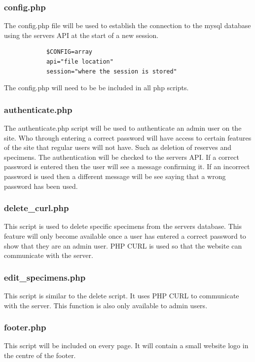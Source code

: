 	\subsubsection{config.php}
		The config.php file will be used to establish the connection to the mysql database using the servers API at the start of a new session.
		\begin{verbatim}
			$CONFIG=array
			api="file location"
			session="where the session is stored"
		\end{verbatim}
		The config.php will need to be be included in all php scripts.


	\subsubsection{authenticate.php}
		The authenticate.php script will be used to authenticate an admin user on the site. Who through entering a correct password will have access to certain features of the site that regular users will not have. Such as deletion of reserves and specimens. The authentication will be checked to the servers API. If a correct password is entered then the user will see a message confirming it. If an incorrect password is used then a different message will be see saying that a wrong password has been used.


	\subsubsection{delete\_curl.php}
		This script is used to delete specific specimens from the servers database. This feature will only become available once a user has entered a correct password to show that they are an admin user. PHP CURL is used so that the website can communicate with the server.


	\subsubsection{edit\_specimens.php}
		This script is similar to the delete script. It uses PHP CURL to communicate with the server. This function is also only available to admin users.


	\subsubsection{footer.php}
		This script will be included on every page. It will contain a small website logo in the centre of the footer. 


